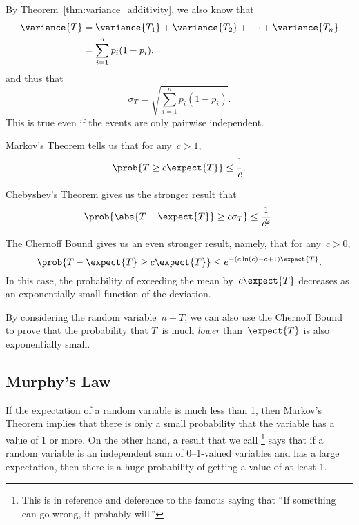By Theorem~\ref{thm:variance_additivity}, we also know that
\begin{align*}
\variance{T}
     &= \variance{T_1} + \variance{T_2} + \dots + \variance{T_n} \\
     &= \sum_{i = 1}^n p_i (1 - p_i),
\end{align*}
and thus that
\begin{equation*}
    \sigma_T = \sqrt{ \sum_{i = 1}^n p_i (1 - p_i) }.
\end{equation*}
This is true even if the events are only pairwise independent.

Markov's Theorem tells us that for any~$c > 1$,
\begin{equation*}
    \prob{ T \ge c \expect{T} } \le \frac{1}{c}.
\end{equation*}

Chebyshev's Theorem gives us the stronger result that
\begin{equation*}
    \prob{ \abs{T - \expect{T}} \ge c \sigma_T } \le \frac{1}{c^2}.
\end{equation*}

The Chernoff Bound gives us an even stronger result, namely, that for
any~$c > 0$,
\begin{equation*}
\prob{T - \expect{T} \ge c \expect{T}}
    \le e^{-(c \ln(c) - c + 1) \expect{T}}.
\end{equation*}
In this case, the probability of exceeding the mean by~$c \expect{T}$
decreases as an exponentially small function of the deviation.

By considering the random variable~$n - T$, we can also use the
Chernoff Bound to prove that the probability that $T$~is much
\emph{lower} than~$\expect{T}$ is also exponentially small.

\subsection{Murphy's Law}

If the expectation of a random variable is much less than 1, then
Markov's Theorem implies that there is only a small probability that
the variable has a value of 1 or more.  On the other hand, a result
that we call \footnote{This is in reference and
  deference to the famous saying that ``If something can go wrong, it probably
  will.''} says that if a random variable is an independent
sum of 0--1-valued variables and has a large expectation, then there is
a huge probability of getting a value of at least 1.

